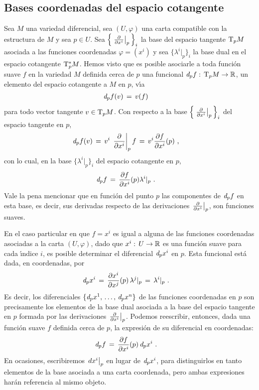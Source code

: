 \subsection{Bases coordenadas del espacio cotangente}
Sea $M$ una variedad diferencial, sea $(U,\varphi)$ una carta compatible
con la estructura de $M$ y sea $p\in U$. Sea
$\Big\{\gancho[p]{x^{i}}\Big\}_{i}$ la base del espacio tangente
$\tangente[p]{M}$ asociada a las funciones coordenadas $\varphi=(x^{i})$ y
sea $\{\lambda^{i}|_{p}\}_{i}$ la base dual en el espacio cotangente
$\tangente*[p]{M}$. Hemos visto que es posible asociarle a toda funci\'{o}n
suave $f$ en la variedad $M$ definida cerca de $p$ una funcional
$\derext[p]{f}:\,\tangente[p]{M}\rightarrow\bb{R}$, un elemento del
espacio cotangente a $M$ en $p$, v\'{\i}a
\begin{align*}
	\derext[p]{f}(v) & \,=\,v(f)
\end{align*}
%
para todo vector tangente $v\in\tangente[p]{M}$. Con respecto a la base
$\Big\{\gancho[p]{x^{i}}\Big\}_{i}$ del espacio tangente en $p$,
\begin{align*}
	\derext[p]{f}(v) & \,=\,v^{i}\,\gancho[p]{x^{i}}f \,=\,
		v^{i}\derivada{f}{x^{i}}(p)
	\text{ ,}
\end{align*}
%
con lo cual, en la base $\{\lambda^{i}|_{p}\}_{i}$ del espacio cotangente
en $p$,
\begin{align*}
	\derext[p]{f} & \,=\,\derivada{f}{x^{i}}(p)\lambda^{i}|_{p}
	\text{ .}
\end{align*}
%
Vale la pena mencionar que en funci\'{o}n del punto $p$ las componentes
de $\derext[p]{f}$ en esta base, es decir, sus derivadas respecto de
las derivaciones $\gancho[p]{x^{i}}$, son funciones suaves.

En el caso particular en que $f=x^{i}$ es igual a alguna de las funciones
coordenadas asociadas a la carta $(U,\varphi)$, dado que
$x^{i}:\,U\rightarrow\bb{R}$ es una funci\'{o}n suave para cada \'{\i}ndice
$i$, es posible determinar el diferencial $\derext[p]{x^{i}}$ en $p$.
Esta funcional est\'{a} dada, en coordenadas, por
\begin{align*}
	\derext[p]{x^{i}} & \,=\, \derivada{x^{i}}{x^{j}}(p)\,\lambda^{j}|_{p}
		\,=\,\lambda^{i}|_{p}
	\text{ .}
\end{align*}
%
Es decir, los diferenciales $\{\derext[p]{x^{1}},\,\dots,\,\derext[p]{x^{n}}\}$
de las funciones coordenadas en $p$ son precisamente los elementos de
la base dual asociada a la base del espacio tangente en $p$ formada
por las derivaciones $\gancho[p]{x^{i}}$. Podemos reescribir, entonces,
dada una funci\'{o}n suave $f$ definida cerca de $p$, la expresi\'{o}n
de su diferencial en coordenadas:
\begin{align*}
	\derext[p]{f} & \,=\,\derivada{f}{x^{i}}(p)\,\derext[p]{x^{i}}
	\text{ .}
\end{align*}
%
En ocasiones, escribiremos $\de[p]{x^{i}}$ en lugar de $\derext[p]{x^{i}}$,
para distinguirlos en tanto elementos de la base asociada a una carta
coordenada, pero ambas expresiones har\'{a}n referencia al mismo objeto.

